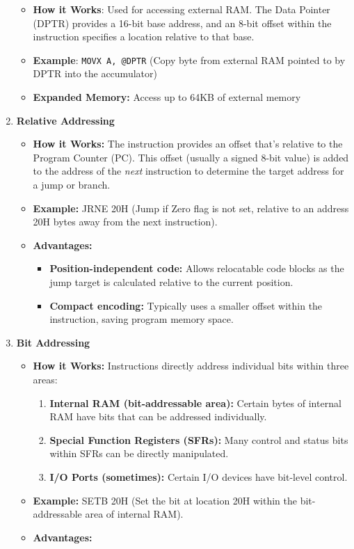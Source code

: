 \documentclass[
]{article}
\begin{document}
\begin{enumerate}
  \begin{itemize}
  \item
    \textbf{How it Works}: Used for accessing external RAM. The Data
    Pointer (DPTR) provides a 16-bit base address, and an 8-bit offset
    within the instruction specifies a location relative to that base.
  \item
    \textbf{Example}: \texttt{MOVX\ A,\ @DPTR} (Copy byte from external
    RAM pointed to by DPTR into the accumulator)
  \item
    \textbf{Expanded Memory:} Access up to 64KB of external memory
  \end{itemize}
\item
  \textbf{Relative Addressing}

  \begin{itemize}
  \item
    \textbf{How it Works:} The instruction provides an offset that's
    relative to the Program Counter (PC). This offset (usually a signed
    8-bit value) is added to the address of the \emph{next} instruction
    to determine the target address for a jump or branch.
  \item
    \textbf{Example:} JRNE 20H (Jump if Zero flag is not set, relative
    to an address 20H bytes away from the next instruction).
  \item
    \textbf{Advantages:}

    \begin{itemize}
    \item
      \textbf{Position-independent code:} Allows relocatable code blocks
      as the jump target is calculated relative to the current position.
    \item
      \textbf{Compact encoding:} Typically uses a smaller offset within
      the instruction, saving program memory space.
    \end{itemize}
  \end{itemize}
\item
  \textbf{Bit Addressing}

  \begin{itemize}
  \item
    \textbf{How it Works:} Instructions directly address individual bits
    within three areas:

    \begin{enumerate}
    \def\labelenumii{\arabic{enumii}.}
    \item
      \textbf{Internal RAM (bit-addressable area):} Certain bytes of
      internal RAM have bits that can be addressed individually.
    \item
      \textbf{Special Function Registers (SFRs):} Many control and
      status bits within SFRs can be directly manipulated.
    \item
      \textbf{I/O Ports (sometimes):} Certain I/O devices have bit-level
      control.
    \end{enumerate}
  \item
    \textbf{Example:} SETB 20H (Set the bit at location 20H within the
    bit-addressable area of internal RAM).
  \item
    \textbf{Advantages:}


\end{itemize}
\end{enumerate}
\end{document}
